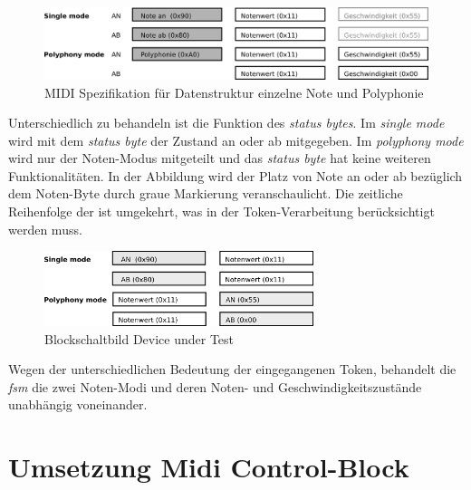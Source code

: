 \begin{figure}[H]
	\centering
	\includegraphics[width=1\textwidth]{images/midi_interface/MIDI_Spezifikation.png}
	\caption{MIDI Spezifikation für Datenstruktur einzelne Note und Polyphonie}
	\label{fig.testbench_single_Mode}
\end{figure}

Unterschiedlich zu behandeln ist die Funktion des \textit{status bytes}. Im \textit{single mode} wird mit dem \textit{status byte} der Zustand an oder ab mitgegeben. Im \textit{polyphony mode} wird nur der Noten-Modus mitgeteilt und das \textit{status byte} hat keine weiteren Funktionalitäten. In der Abbildung wird der Platz von Note an oder ab bezüglich dem Noten-Byte durch graue Markierung veranschaulicht. Die zeitliche Reihenfolge der ist umgekehrt, was in der Token-Verarbeitung berücksichtigt werden muss.\\

\begin{figure}[H]
	\centering
	\includegraphics[width=0.7\textwidth]{images/midi_interface/MIDI_Spezifikation_Datenfolge.png}
	\caption{Blockschaltbild Device under Test}
	\label{fig.testbench_polypphon_mode}
\end{figure}

Wegen der unterschiedlichen Bedeutung der eingegangenen Token, behandelt die \textit{fsm} die zwei Noten-Modi und deren Noten- und Geschwindigkeitszustände unabhängig voneinander.



\newpage
\section{Umsetzung Midi Control-Block}\label{sect.midi_umsetzung}

